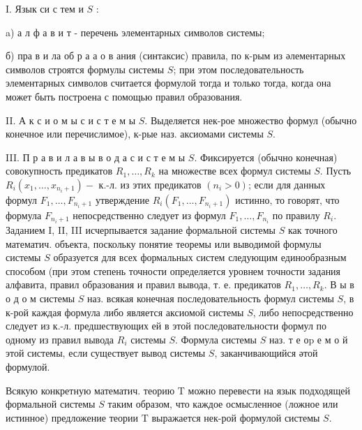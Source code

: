\documentclass[10pt]{article}
\begin{document}
I. Язык си с тем и $S$ :



a) а л ф а в и т - перечень элементарных символов системы;



б) пра в и ла об р а $а$ о в ания (синтаксис) правила, по к-рым из әлементарных символов строятся формулы системы $S$; при этом последовательность элементарных символов считается формулой тогда и только тогда, когда она может быть построена с помощью правил образования.



II. А к с и о м ы с и с т е м ы $S$. Выделяется нек-рое множество формул (обычно конечное или перечислимое), к-рые наз. аксиомами системы $S$.



III. П р а в и л а в ы в о д а с и с т е м ы $S$. Фиксируется (обычно конечная) совокупность предикатов $R_{1}, \ldots, R_{k}$ на множестве всех формул системы $S$. Пусть $R_{i}\left(x_{1}, \ldots, x_{n_{i}+1}\right)-$ к.-л. из этих предикатов $\left(n_{i}>0\right)$; если для данных формул $F_{1}, \ldots, F_{n_{i}+1}$ утверждение $R_{i}\left(F_{1}, \ldots, F_{n_{i}+1}\right)$ истинно, то говорят, что формула $F_{n_{i}+1}$ непосредственно следует из формул $F_{1}, \ldots, F_{n_{i}}$ по правилу $R_{i}$. Заданием I, II, III исчерпывается задание формальной системы $S$ как точного математич. объекта, поскольку понятие теоремы или выводимой формулы системы $S$ образуется для всех формальных систем следующим единообразным способом (при этом степень точности определяется уровнем точности задания алфавита, правил образования и правил вывода, т. е. предикатов $R_{1}, \ldots, R_{k}$. В ы в о д о м системы $S$ наз. всякая конечная последовательность формул системы $S$, в к-рой каждая формула либо является аксиомой системы $S$, либо непосредственно следует из к.-л. предшествующих ей в этой последовательности формул по одному из правил вывода $R_{i}$ системы $S$. Формула системы $S$ наз. т е о$\mathrm{p}$ е м о й этой системы, если существует вывод системы $S$, заканчивающийся әтой формулой.



Всякую конкретную математич. теорию $\mathrm{T}$ можно перевести на язык подходящей формальной системы $S$ таким образом, что каждое осмысленное (ложное или истинное) предложение теории $\mathrm{T}$ выражается нек-рой формулой системы $S$.
\end{document}
